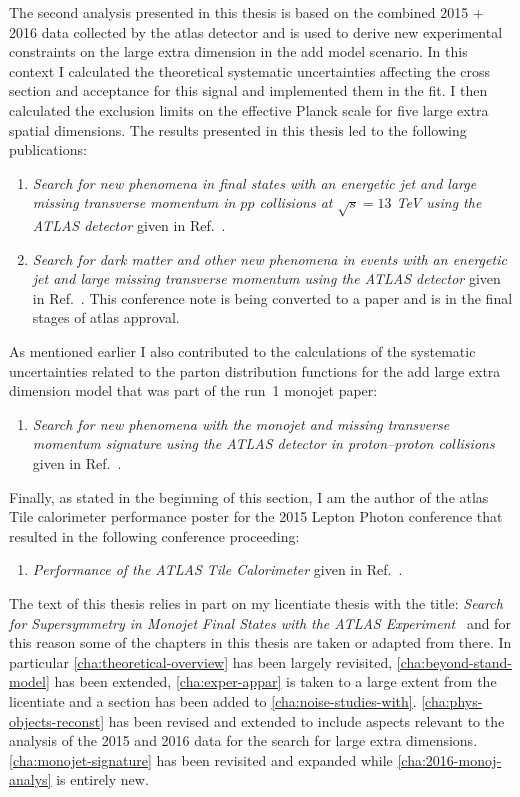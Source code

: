 The second analysis presented in this thesis is based on the combined 2015 +
2016 data collected by the \gls{atlas} detector and is used to derive new
experimental constraints on the large extra dimension in the \gls{add} model
scenario. In this context I calculated the theoretical systematic uncertainties
affecting the cross section and acceptance for this signal and implemented them
in the fit. I then calculated the exclusion limits on the effective Planck scale
for five large extra spatial dimensions. The results presented in this thesis
led to the following publications:
\begin{enumerate}[A -]
\item \emph{{Search for new phenomena in final states with an energetic jet and
      large missing transverse momentum in $pp$ collisions at $\sqrt{s} = 13$
      TeV using the ATLAS detector}} given in Ref.~\cite{MonoJetPaper}.
\item \emph{{Search for dark matter and other new phenomena in events with an
      energetic jet and large missing transverse momentum using the ATLAS
      detector}} given in Ref.~\cite{MonoJetPaper2016}. This conference note is
  being converted to a paper and is in the final stages of \gls{atlas} approval.
\end{enumerate}
As mentioned earlier I also contributed to the calculations of the systematic
uncertainties related to the parton distribution functions for the \gls{add}
large extra dimension model that was part of the run~1 monojet paper:
\begin{enumerate}[C -]
\item \emph{Search for new phenomena with the monojet and missing transverse
    momentum signature using the ATLAS detector in proton–proton
    collisions} given in Ref.~\cite{RunIPaper}.
\end{enumerate}
Finally, as stated in the beginning of this section, I am the author of the
\gls{atlas} Tile calorimeter performance poster for the 2015 Lepton Photon
conference that resulted in the following conference proceeding:
\begin{enumerate}[D -]
\item \emph{{Performance of the ATLAS Tile Calorimeter}} given in
  Ref.~\cite{TileCalPerformanceBertoli}.
\end{enumerate}

The text of this thesis relies in part on my licentiate thesis with the title:
\emph{Search for Supersymmetry in Monojet Final States with the ATLAS
  Experiment}~\cite{MyLicentiate} and for this reason some of the chapters in
this thesis are taken or adapted from there. In particular
\cref{cha:theoretical-overview} has been largely revisited,
\cref{cha:beyond-stand-model} has been extended, \cref{cha:exper-appar} is taken
to a large extent from the licentiate and a section has been added to
\cref{cha:noise-studies-with}. \cref{cha:phys-objects-reconst} has been revised
and extended to include aspects relevant to the analysis of the 2015 and 2016
data for the search for large extra dimensions. \cref{cha:monojet-signature} has
been revisited and expanded while \cref{cha:2016-monoj-analys} is entirely new.
